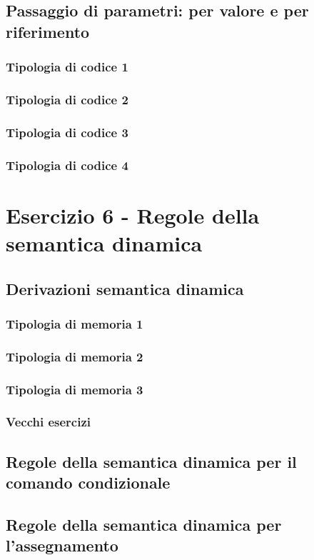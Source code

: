 \documentclass[a4paper]{article}
\begin{document}
	\subsection{Passaggio di parametri: per valore e per riferimento}
	
	\subsubsection{Tipologia di codice 1}
	
	\subsubsection{Tipologia di codice 2}
	
	\subsubsection{Tipologia di codice 3}
	
	\subsubsection{Tipologia di codice 4}
	
	\section{Esercizio 6 - Regole della semantica dinamica}
	
	\subsection{Derivazioni semantica dinamica}
	
	\subsubsection{Tipologia di memoria 1}
	
	\subsubsection{Tipologia di memoria 2}
	
	\subsubsection{Tipologia di memoria 3}
	
	\subsubsection{Vecchi esercizi}
	
	\subsection{Regole della semantica dinamica per il comando condizionale}
	
	
	\subsection{Regole della semantica dinamica per l'assegnamento}
	
\end{document}
